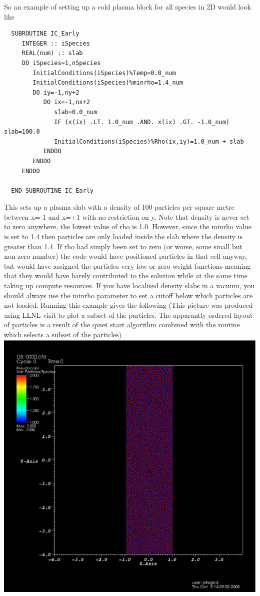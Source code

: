 \documentclass[12pt]{article}
\begin{document}
So an example of setting up a cold plasma block for all species in 2D would look like
\begin{verbatim}
  SUBROUTINE IC_Early
     INTEGER :: iSpecies
     REAL(num) :: slab
     DO iSpecies=1,nSpecies
        InitialConditions(iSpecies)%Temp=0.0_num
        InitialConditions(iSpecies)%minrho=1.4_num
        DO iy=-1,ny+2
           DO ix=-1,nx+2
              slab=0.0_num
              IF (x(ix) .LT. 1.0_num .AND. x(ix) .GT. -1.0_num) slab=100.0
              InitialConditions(iSpecies)%Rho(ix,iy)=1.0_num + slab
           ENDDO
        ENDDO
     ENDDO
     
  END SUBROUTINE IC_Early
\end{verbatim}
This sets up a plasma slab with a density of 100 particles per square metre between x=-1 and x=+1 with no restriction on y. Note that density is never set to zero anywhere, the lowest value of rho is 1.0. However, since the minrho value is set to 1.4 then particles are only loaded inside the slab where the density is greater than 1.4. If rho had simply been set to zero (or worse, some small but non-zero number) the code would have positioned particles in that cell anyway, but would have assigned the particles very low or zero weight functions meaning that they would have barely contributed to the solution while at the same time taking up compute resources. If you have localised density slabs in a vacuum, you should always use the minrho parameter to set a cutoff below which particles are not loaded. Running this example gives the following (This picture was produced using LLNL visit to plot a subset of the particles. The apparantly ordered layout of particles is a result of the quiet start algorithm combined with the routine which selects a subset of the particles)\\
{\center \includegraphics{./images/example.eps}\\}
\end{document}
